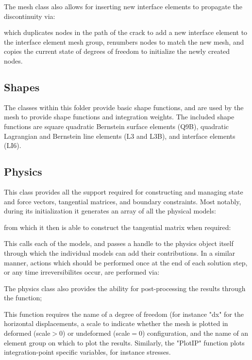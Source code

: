 \documentclass[3p]{elsarticle} %
\begin{document}
The mesh class also allows for inserting new interface elements to propagate the discontinuity via:

which duplicates nodes in the path of the crack to add a new interface element to the interface element mesh group, renumbers nodes to match the new mesh, and copies the current state of degrees of freedom to initialize the newly created nodes.

\subsection{Shapes}
The classes within this folder provide basic shape functions, and are used by the mesh to provide shape functions and integration weights. The included shape functions are square quadratic Bernstein surface elements (Q9B), quadratic Lagrangian and Bernstein line elements (L3 and L3B), and interface elements (LI6).

\subsection{Physics}
This class provides all the support required for constructing and managing state and force vectors, tangential matrices, and boundary constraints. Most notably, during its initialization it generates an array of all the physical models:

from which it then is able to construct the tangential matrix when required:

This calls each of the models, and passes a handle to the physics object itself through which the individual models can add their contributions.  In a similar manner, actions which should be performed once at the end of each solution step, or any time irreversibilites occur, are performed via:


The physics class also provides the ability for post-processing the results through the function;

This function requires the name of a degree of freedom (for instance "dx" for the horizontal displacements, a scale to indicate whether the mesh is plotted in deformed (scale$>$0) or undeformed (scale$=$0) configuration, and the name of an element group on which to plot the results. Similarly, the "PlotIP" function plots integration-point specific variables, for instance stresses.
\end{document}
